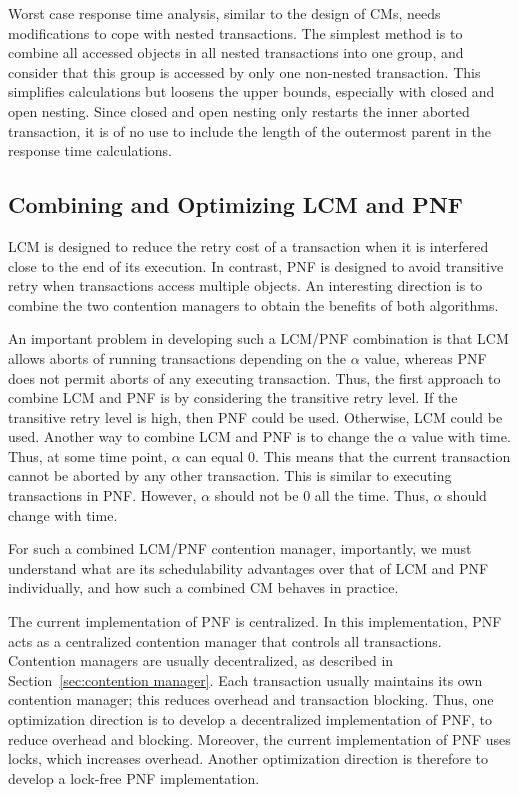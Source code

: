 \documentclass[12pt,english]{report}
\begin{document}
Worst case response time analysis, similar to the design of CMs, needs modifications  to cope with nested transactions. The simplest method is to combine all accessed objects in all nested transactions into one group, and consider that this group is accessed by only one non-nested transaction. This simplifies calculations but loosens the upper bounds, especially with closed and open nesting. Since closed and open nesting only restarts the inner aborted transaction, it is of no use to include the length of the outermost parent in the response time calculations.


\subsection{Combining and Optimizing LCM and PNF} 

LCM is designed to reduce the retry cost of a transaction when it is interfered close to the end of its execution. In contrast, PNF is designed to avoid transitive retry when transactions access multiple objects. An interesting direction is to combine the two contention managers to obtain the benefits of both algorithms. 

An important problem in developing such a LCM/PNF combination is that LCM allows aborts of running transactions depending on the $\alpha$ value, whereas PNF does not permit aborts of any executing transaction. Thus, the first approach to combine LCM and PNF is by considering the transitive retry level. If the transitive retry level is high, then PNF could be used. Otherwise, LCM could be used. Another way to combine LCM and PNF is to change the $\alpha$ value with time. Thus, at some time point, $\alpha$ can equal $0$. This means that the current transaction cannot be aborted by any other transaction. This is similar to executing transactions in PNF. However, $\alpha$ should not be $0$ all the time. Thus, $\alpha$ should change with time.

For such a combined LCM/PNF contention manager, importantly, we must  understand what are its schedulability advantages over that of LCM and PNF individually, and how such a combined CM behaves in practice. 


The current implementation of PNF is centralized. In this implementation, PNF acts as a centralized contention manager that controls all transactions. Contention managers are usually decentralized, as described in Section~\ref{sec:contention manager}. Each transaction usually maintains its own contention manager; this reduces overhead and transaction blocking. Thus, one optimization direction is to develop a decentralized implementation of PNF, to reduce overhead and blocking. Moreover, the current implementation of PNF uses locks, which increases overhead. Another optimization direction is therefore to develop a lock-free PNF implementation.
\end{document}
